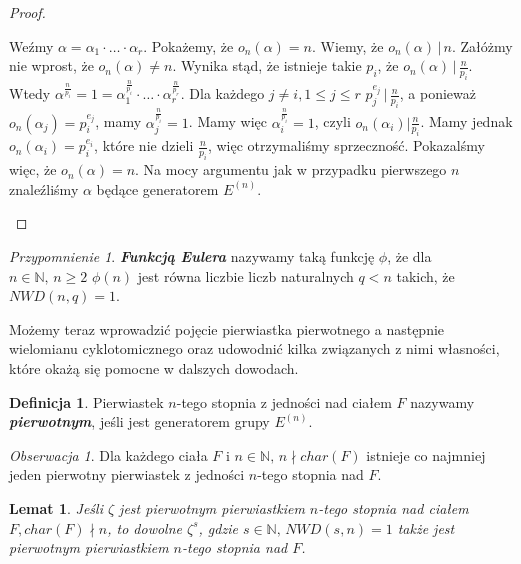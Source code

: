 \documentclass[declaration,shortabstract]{iithesis}
\theoremstyle{definition}
\newtheorem{definition}{Definicja}
\theoremstyle{remark} \newtheorem{observation}{Obserwacja}
\theoremstyle{plain} \newtheorem{theorem}{Twierdzenie}
\theoremstyle{plain} \newtheorem{lemma}{Lemat}
\theoremstyle{remark} \newtheorem*{remark*}{Uwaga}
\theoremstyle{reminder} \newtheorem*{reminder*}{Przypomnienie}
\begin{document}
\begin{proof}
\begin{enumerate}[label=(\arabic*),leftmargin=.4in]
\begin{enumerate}[label=(3.\arabic*)]
            Weźmy $\alpha = \alpha_1 \cdot \dots \cdot \alpha_r$. Pokażemy, że $o_n(\alpha) = n$. Wiemy, że $o_n(\alpha) \, | \, n$. Załóżmy nie wprost, że $o_n(\alpha) \neq n$. Wynika stąd, że istnieje takie $p_i$, że $o_n(\alpha) \, | \, \frac{n}{p_i}$. Wtedy $\alpha^{\frac{n}{p_i}} = 1 = \alpha_1^{\frac{n}{p_i}} \cdot \dots \cdot \alpha_r^{\frac{n}{p_r}}$. Dla każdego $j \neq i, 1 \leq j \leq r$ $p_j^{e_j} \, | \, \frac{n}{p_i}$, a ponieważ $o_n(\alpha_j) = p_i^{e_j}$, mamy $\alpha_j^{\frac{n}{p_i}} = 1$. Mamy więc $\alpha_i^{\frac{n}{p_i}} = 1$, czyli $o_n(\alpha_i) | \frac{n}{p_i}$. Mamy jednak $o_n(\alpha_i) = p_i^{e_i}$, które nie dzieli $\frac{n}{p_i}$, więc otrzymaliśmy sprzeczność. Pokazalśmy więc, że $o_n(\alpha) = n$. Na mocy argumentu jak w przypadku pierwszego $n$ znaleźliśmy $\alpha$ będące generatorem $E^{(n)}$.
        \end{enumerate}
    \end{enumerate}
\end{proof}
    

\begin{reminder*}
	\textbf{\textit{Funkcją Eulera}} nazywamy taką funkcję $\phi$, że dla $n \in \mathbb{N}, \, n \geq 2$ $\phi(n)$ jest równa liczbie liczb naturalnych $q < n$ takich, że $NWD(n, q) = 1$. 
\end{reminder*}

Możemy teraz wprowadzić pojęcie pierwiastka pierwotnego a następnie wielomianu cyklotomicznego oraz udowodnić kilka związanych z nimi własności, które okażą się pomocne w dalszych dowodach.

\begin{definition}
	Pierwiastek $n$-tego stopnia z jedności nad ciałem $F$ nazywamy \textbf{\textit{pierwotnym}}, jeśli jest generatorem grupy $E^{(n)}$.
\end{definition}
	
\begin{observation}
	Dla każdego ciała $F$ i $n \in \mathbb{N}, \, n \nmid char(F)$  istnieje co najmniej jeden pierwotny pierwiastek z jedności $n$-tego stopnia nad $F$.
\end{observation}
	
\begin{lemma}\label{pierwotne}
	Jeśli $\zeta$ jest pierwotnym pierwiastkiem $n$-tego stopnia nad ciałem $F, char(F) \nmid n$, to dowolne $\zeta^s$, gdzie $s \in \mathbb{N}, \, NWD(s, n) = 1$ także jest pierwotnym pierwiastkiem $n$-tego stopnia nad $F$.
\end{lemma}
	
\end{document}

